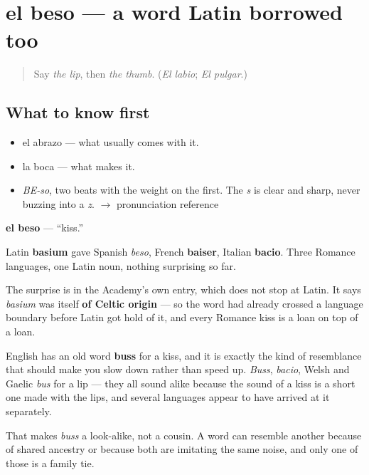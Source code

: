 \section[el beso]{el beso — a word Latin borrowed too}

\label{lesson:ES-C375-beso}



\begin{quote}
Say \emph{the lip}, then \emph{the thumb}. (\emph{El labio}; \emph{El pulgar}.)
\end{quote}

\subsection*{What to know first}
\begin{itemize}
\raggedright
  \item el abrazo — what usually comes with it.
  \item la boca — what makes it.
\end{itemize}

\begin{sounds}
\begin{itemize}
\raggedright
  \item \emph{BE-so}, two beats with the weight on the first. The \emph{s} is clear and sharp, never buzzing into a \emph{z}. $\to$ pronunciation reference
\end{itemize}
\end{sounds}

\begin{cousinweb}
\textbf{el beso} — \textquotedblleft{}kiss.\textquotedblright{}

Latin \textbf{basium} gave Spanish \emph{beso}, French \textbf{baiser}, Italian \textbf{bacio}. Three Romance languages, one Latin noun, nothing surprising so far.

The surprise is in the Academy's own entry, which does not stop at Latin. It says \emph{basium} was itself \textbf{of Celtic origin} — so the word had already crossed a language boundary before Latin got hold of it, and every Romance kiss is a loan on top of a loan.

English has an old word \textbf{buss} for a kiss, and it is exactly the kind of resemblance that should make you slow down rather than speed up. \emph{Buss}, \emph{bacio}, Welsh and Gaelic \emph{bus} for a lip — they all sound alike because the sound of a kiss is a short one made with the lips, and several languages appear to have arrived at it separately.

That makes \emph{buss} a look-alike, not a cousin. A word can resemble another because of shared ancestry or because both are imitating the same noise, and only one of those is a family tie.
\end{cousinweb}

